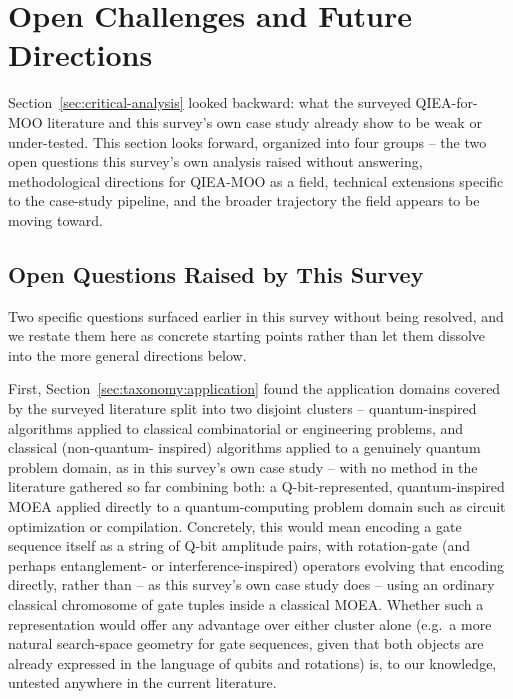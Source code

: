 \section{Open Challenges and Future Directions}
\label{sec:open-challenges}

Section~\ref{sec:critical-analysis} looked backward: what the surveyed
QIEA-for-MOO literature and this survey's own case study already show
to be weak or under-tested. This section looks forward, organized into
four groups -- the two open questions this survey's own analysis raised
without answering, methodological directions for QIEA-MOO as a field,
technical extensions specific to the case-study pipeline, and the
broader trajectory the field appears to be moving toward.

\subsection{Open Questions Raised by This Survey}
\label{sec:open-challenges:raised}

Two specific questions surfaced earlier in this survey without being
resolved, and we restate them here as concrete starting points rather
than let them dissolve into the more general directions below.

First, Section~\ref{sec:taxonomy:application} found the application
domains covered by the surveyed literature split into two disjoint
clusters -- quantum-inspired algorithms applied to classical
combinatorial or engineering problems, and classical (non-quantum-
inspired) algorithms applied to a genuinely quantum problem domain, as
in this survey's own case study -- with no method in the literature
gathered so far combining both: a Q-bit-represented, quantum-inspired
MOEA applied directly to a quantum-computing problem domain such as
circuit optimization or compilation. Concretely, this would mean
encoding a gate sequence itself as a string of Q-bit amplitude pairs,
with rotation-gate (and perhaps entanglement- or interference-inspired)
operators evolving that encoding directly, rather than -- as this
survey's own case study does -- using an ordinary classical chromosome
of gate tuples inside a classical MOEA. Whether such a representation
would offer any advantage over either cluster alone (e.g.\ a more
natural search-space geometry for gate sequences, given that both
objects are already expressed in the language of qubits and rotations)
is, to our knowledge, untested anywhere in the current literature.

